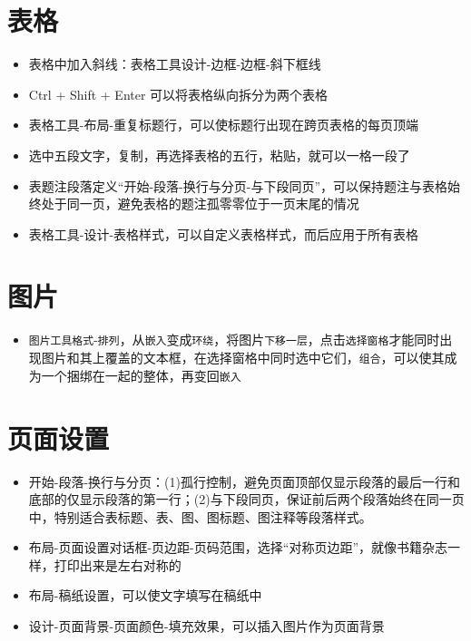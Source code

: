 \documentclass[]{ctexbook}
\providecommand{\tightlist}{%
  \setlength{\itemsep}{0pt}\setlength{\parskip}{0pt}}
\begin{document}
\hypertarget{ux8868ux683c}{%
\chapter{表格}\label{ux8868ux683c}}

\begin{itemize}
\tightlist
\item
  表格中加入斜线：表格工具\textbar 设计-边框-边框-斜下框线
\item
  Ctrl + Shift + Enter 可以将表格纵向拆分为两个表格
\item
  表格工具-布局-重复标题行，可以使标题行出现在跨页表格的每页顶端
\item
  选中五段文字，复制，再选择表格的五行，粘贴，就可以一格一段了
\item
  表题注段落定义``开始-段落-换行与分页-与下段同页''，可以保持题注与表格始终处于同一页，避免表格的题注孤零零位于一页末尾的情况
\item
  表格工具-设计-表格样式，可以自定义表格样式，而后应用于所有表格
\end{itemize}

\hypertarget{ux56feux7247}{%
\chapter{图片}\label{ux56feux7247}}

\begin{itemize}
\tightlist
\item
  \texttt{图片工具\textbar{}格式}-\texttt{排列}，从\texttt{嵌入}变成\texttt{环绕}，将图片\texttt{下移一层}，点击\texttt{选择窗格}才能同时出现图片和其上覆盖的文本框，在选择窗格中同时选中它们，\texttt{组合}，可以使其成为一个捆绑在一起的整体，再变回\texttt{嵌入}
\end{itemize}

\hypertarget{ux9875ux9762ux8bbeux7f6e}{%
\chapter{页面设置}\label{ux9875ux9762ux8bbeux7f6e}}

\begin{itemize}
\tightlist
\item
  开始-段落-换行与分页：(1)孤行控制，避免页面顶部仅显示段落的最后一行和底部的仅显示段落的第一行；(2)与下段同页，保证前后两个段落始终在同一页中，特别适合表标题、表、图、图标题、图注释等段落样式。
\item
  布局-页面设置对话框-页边距-页码范围，选择``对称页边距''，就像书籍杂志一样，打印出来是左右对称的
\item
  布局-稿纸设置，可以使文字填写在稿纸中
\item
  设计-页面背景-页面颜色-填充效果，可以插入图片作为页面背景
\end{itemize}
\end{document}
